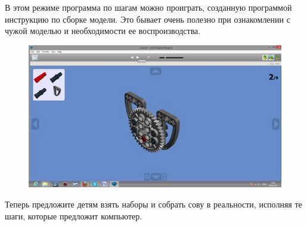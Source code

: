 В этом режиме программа по шагам можно проиграть, созданную программой инструкцию по сборке модели. Это бывает очень полезно при ознакомлении с чужой моделью и необходимости ее воспроизводства.
\begin{figure}[h!]
	\begin{center}
		\includegraphics[width=1\linewidth]{chapters/chapter3/images/23}
		\caption{}
		\label{ris:image3x23}
	\end{center}
\end{figure}

Теперь предложите детям взять наборы и собрать сову в реальности, исполняя те шаги, которые предложит компьютер.